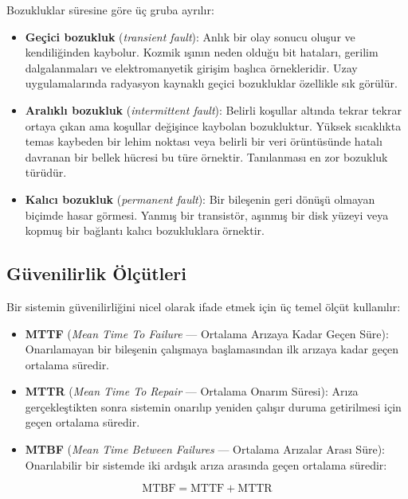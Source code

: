 Bozukluklar süresine göre üç gruba ayrılır:
\begin{itemize}
    \item \textbf{Geçici bozukluk} (\emph{transient fault}): Anlık bir olay sonucu oluşur ve kendiliğinden kaybolur. Kozmik ışının neden olduğu bit hataları, gerilim dalgalanmaları ve elektromanyetik girişim başlıca örnekleridir. Uzay uygulamalarında radyasyon kaynaklı geçici bozukluklar özellikle sık görülür.
    \item \textbf{Aralıklı bozukluk} (\emph{intermittent fault}): Belirli koşullar altında tekrar tekrar ortaya çıkan ama koşullar değişince kaybolan bozukluktur. Yüksek sıcaklıkta temas kaybeden bir lehim noktası veya belirli bir veri örüntüsünde hatalı davranan bir bellek hücresi bu türe örnektir. Tanılanması en zor bozukluk türüdür.
    \item \textbf{Kalıcı bozukluk} (\emph{permanent fault}): Bir bileşenin geri dönüşü olmayan biçimde hasar görmesi. Yanmış bir transistör, aşınmış bir disk yüzeyi veya kopmuş bir bağlantı kalıcı bozukluklara örnektir.
\end{itemize}

\subsection{Güvenilirlik Ölçütleri}
\label{subsec:guvenilirlik-olcutleri}

Bir sistemin güvenilirliğini nicel olarak ifade etmek için üç temel ölçüt kullanılır:

\begin{itemize}
    \item \textbf{MTTF} (\emph{Mean Time To Failure} --- Ortalama Arızaya Kadar Geçen Süre): Onarılamayan bir bileşenin çalışmaya başlamasından ilk arızaya kadar geçen ortalama süredir.

    \item \textbf{MTTR} (\emph{Mean Time To Repair} --- Ortalama Onarım Süresi): Arıza gerçekleştikten sonra sistemin onarılıp yeniden çalışır duruma getirilmesi için geçen ortalama süredir.

    \item \textbf{MTBF} (\emph{Mean Time Between Failures} --- Ortalama Arızalar Arası Süre): Onarılabilir bir sistemde iki ardışık arıza arasında geçen ortalama süredir:
\end{itemize}
%
\begin{equation}
\text{MTBF} = \text{MTTF} + \text{MTTR}
\label{eq:mtbf}
\end{equation}

